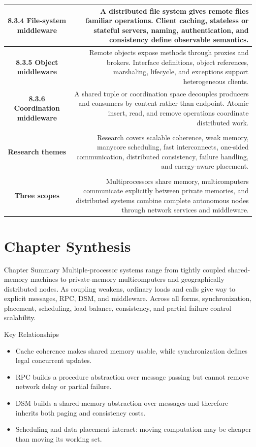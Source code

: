 \documentclass[10pt,letterpaper]{article}
\begin{document}
\begin{longtable}{C N}
\textbf{8.3.4 File-system middleware} & A distributed file system gives remote files familiar operations. Client caching, stateless or stateful servers, naming, authentication, and consistency define observable semantics.\\\hline
\textbf{8.3.5 Object middleware} & Remote objects expose methods through proxies and brokers. Interface definitions, object references, marshaling, lifecycle, and exceptions support heterogeneous clients.\\\hline
\textbf{8.3.6 Coordination middleware} & A shared tuple or coordination space decouples producers and consumers by content rather than endpoint. Atomic insert, read, and remove operations coordinate distributed work.\\\hline
{}\\*\hline
\textbf{Research themes} & Research covers scalable coherence, weak memory, manycore scheduling, fast interconnects, one-sided communication, distributed consistency, failure handling, and energy-aware placement.\\\hline
{}\\*\hline
\textbf{Three scopes} & Multiprocessors share memory, multicomputers communicate explicitly between private memories, and distributed systems combine complete autonomous nodes through network services and middleware.\\\hline
\end{longtable}
\normalsize

\section*{Chapter Synthesis}
\begin{studybox}{Chapter Summary}
Multiple-processor systems range from tightly coupled shared-memory machines to private-memory multicomputers and geographically distributed nodes. As coupling weakens, ordinary loads and calls give way to explicit messages, RPC, DSM, and middleware. Across all forms, synchronization, placement, scheduling, load balance, consistency, and partial failure control scalability.
\end{studybox}

\begin{studybox}{Key Relationships}
\begin{itemize}
  \item Cache coherence makes shared memory usable, while synchronization defines legal concurrent updates.
  \item RPC builds a procedure abstraction over message passing but cannot remove network delay or partial failure.
  \item DSM builds a shared-memory abstraction over messages and therefore inherits both paging and consistency costs.
  \item Scheduling and data placement interact: moving computation may be cheaper than moving its working set.
\end{itemize}
\end{studybox}
\end{document}
